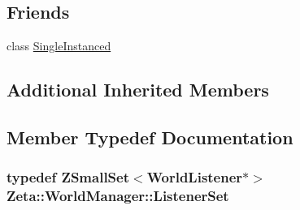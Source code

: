 \subsection*{Friends}
\begin{DoxyCompactItemize}
\item 
class \hyperlink{classZeta_1_1WorldManager_a2fa95d69b32a77fffa4b730679a8b08c}{Single\+Instanced}
\end{DoxyCompactItemize}
\subsection*{Additional Inherited Members}


\subsection{Member Typedef Documentation}
\hypertarget{classZeta_1_1WorldManager_aab11e4268a3e5b0d650668134bf73ef0}{
\subsubsection[{Listener\+Set}]{\setlength{\rightskip}{0pt plus 5cm}typedef {\bf Z\+Small\+Set}$<${\bf World\+Listener}$\ast$$>$ {\bf Zeta\+::\+World\+Manager\+::\+Listener\+Set}\hspace{0.3cm}{\ttfamily [private]}}}\label{classZeta_1_1WorldManager_aab11e4268a3e5b0d650668134bf73ef0}


